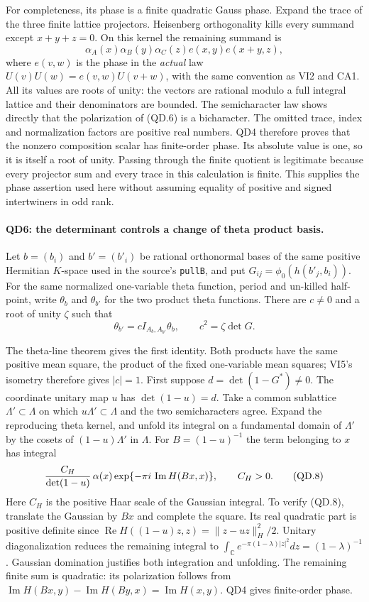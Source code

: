 For completeness, its phase is a finite quadratic Gauss phase.
Expand the trace of the three finite lattice projectors.
Heisenberg orthogonality kills every summand except
$x+y+z=0$.  On this kernel the remaining summand is
\[
 \alpha_A(x)\alpha_B(y)\alpha_C(z)
          e(x,y)e(x+y,z),                                \tag{QD.6}
\]
where $e(v,w)$ is the phase in the \emph{actual} law
$U(v)U(w)=e(v,w)U(v+w)$, with the same convention as VI2
and CA1.  All its values are roots of unity: the vectors are
rational modulo a full integral lattice and their denominators
are bounded.  The semicharacter law shows directly that the
polarization of (QD.6) is a bicharacter.  The omitted trace,
index and normalization factors are positive real numbers.
QD4 therefore proves that the nonzero composition scalar has
finite-order phase.  Its absolute value is one, so it is itself
a root of unity.  Passing through the finite quotient is legitimate
because every projector sum and every trace in this calculation
is finite.  This supplies the phase assertion used here without
assuming equality of positive and signed intertwiners in odd rank.

\paragraph{QD6: the determinant controls a change of theta product basis.}
Let $b=(b_i)$ and $b'=(b'_i)$ be rational orthonormal bases of
the same positive Hermitian $K$-space used in the source's
\texttt{pullB}, and put
$G_{ij}=\phi_0(h(b'_j,b_i))$.  For the same normalized one-variable
theta function, period and un-killed half-point, write $\theta_b$
and $\theta_{b'}$ for the two product theta functions.  There are
$c\ne0$ and a root of unity $\zeta$ such that
\[
 \theta_{b'}=c I_{A_b,A_{b'}}\theta_b,
                         \qquad c^2=\zeta\det G.          \tag{QD.7}
\]

The theta-line theorem gives the first identity.  Both products
have the same positive mean square, the product of the fixed
one-variable mean squares; VI5's isometry therefore gives
$|c|=1$.  First suppose $d=\det(1-G^*)\ne0$.  The coordinate
unitary map $u$ has $\det(1-u)=d$.  Take a common sublattice
$\Lambda'\subset\Lambda$ on which $u\Lambda'\subset\Lambda$
and the two semicharacters agree.  Expand the reproducing theta
kernel, and unfold its integral on a fundamental domain of
$\Lambda'$ by the cosets of $(1-u)\Lambda'$ in $\Lambda$.
For $B=(1-u)^{-1}$ the term belonging to $x$ has integral
\[
 {C_H\over\det(1-u)}\,
       \alpha(x)\exp\{-\pi i\,\operatorname{Im}H(Bx,x)\},
                         \qquad C_H>0.                   \tag{QD.8}
\]
Here $C_H$ is the positive Haar scale of the Gaussian integral.
To verify (QD.8), translate the Gaussian by $Bx$ and complete
the square.  Its real quadratic part is positive definite since
$\operatorname{Re}H((1-u)z,z)=\|z-uz\|_H^2/2$.
Unitary diagonalization reduces the remaining integral to
$\int_{\mathbb C}e^{-\pi(1-\lambda)|z|^2}dz=(1-\lambda)^{-1}$.
Gaussian domination justifies both integration and unfolding.
The remaining finite sum is quadratic: its polarization follows
from
$\operatorname{Im}H(Bx,y)-\operatorname{Im}H(By,x)
=\operatorname{Im}H(x,y)$.  QD4 gives finite-order phase.

